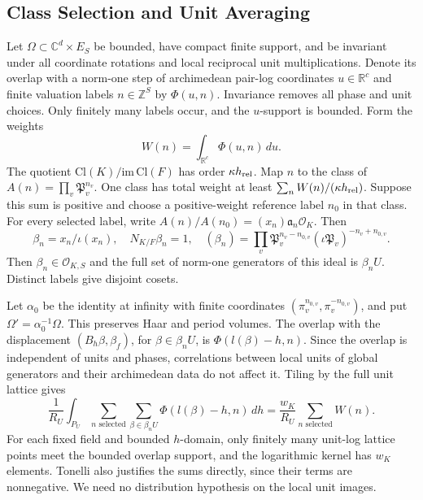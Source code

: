 \subsection{Class Selection and Unit Averaging}

Let $\Omega\subset\mathbb C^d\times E_S$ be bounded, have compact finite
support, and be invariant under all coordinate rotations and local
reciprocal unit multiplications. Denote its overlap with a norm-one step
of archimedean pair-log coordinates $u\in\mathbb R^c$ and finite valuation
labels $n\in\mathbb Z^S$ by $\Phi(u,n)$. Invariance removes all phase and
unit choices. Only finitely many labels occur, and the $u$-support is
bounded. Form the weights
\[
 W(n)=\int_{\mathbb R^c}\Phi(u,n)\,du.
\]
The quotient $\mathrm{Cl}(K)/\mathrm{im}\,\mathrm{Cl}(F)$ has order
$\kappa h_{\rm rel}$. Map $n$ to the class of
$A(n)=\prod_v\mathfrak P_v^{n_v}$. One class has total weight at least
$\sum_nW(n)/(\kappa h_{\rm rel})$. Suppose this sum is positive and
choose a positive-weight reference label $n_0$ in that class.
For every selected label, write
$A(n)/A(n_0)=(x_n)\mathfrak a_n\mathcal O_K$. Then
\[
 \beta_n=x_n/\iota(x_n),\quad N_{K/F}\beta_n=1,\quad
 (\beta_n)=\prod_v\mathfrak P_v^{n_v-n_{0,v}}
                  (\iota\mathfrak P_v)^{-n_v+n_{0,v}}.
\]
Then $\beta_n\in\mathcal O_{K,S}$ and the full set of norm-one generators
of this ideal is $\beta_nU$. Distinct labels give disjoint cosets.

Let $\alpha_0$ be the identity at infinity with finite coordinates
$(\pi_v^{n_{0,v}},\pi_v^{-n_{0,v}})$, and put $\Omega'=\alpha_0^{-1}\Omega$.
This preserves Haar and period volumes. The overlap with the displacement
$(B_h\beta,\beta_f)$, for $\beta\in\beta_nU$, is
$\Phi(l(\beta)-h,n)$. Since the overlap is independent of units and
phases, correlations between local units of global generators and their
archimedean data do not affect it. Tiling by the full unit lattice gives
\[
 \frac1{R_U}\int_{P_U}\sum_{n\text{ selected}}
 \sum_{\beta\in\beta_nU}\Phi(l(\beta)-h,n)\,dh
 =\frac{w_K}{R_U}\sum_{n\text{ selected}}W(n).
\]
For each fixed field and bounded $h$-domain, only finitely many unit-log
lattice points meet the bounded overlap support, and the logarithmic
kernel has $w_K$ elements. Tonelli also justifies the sums directly,
since their terms are nonnegative. We need no distribution hypothesis
on the local unit images.


